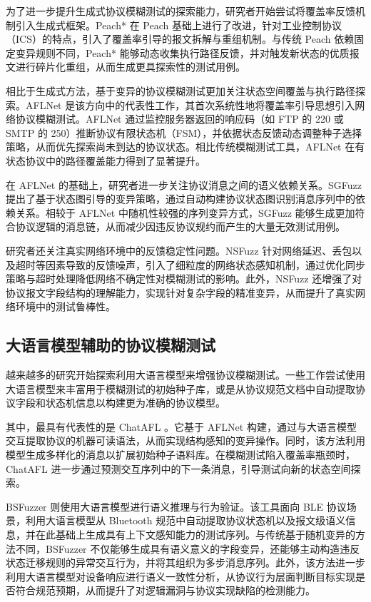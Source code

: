 为了进一步提升生成式协议模糊测试的探索能力，研究者开始尝试将覆盖率反馈机制引入生成式框架。Peach*\cite{Luoetal2020} 在 Peach 基础上进行了改进，针对工业控制协议（ICS）的特点，引入了覆盖率引导的报文拆解与重组机制。与传统 Peach 依赖固定变异规则不同，Peach* 能够动态收集执行路径反馈，并对触发新状态的优质报文进行碎片化重组，从而生成更具探索性的测试用例。

相比于生成式方法，基于变异的协议模糊测试更加关注状态空间覆盖与执行路径探索。AFLNet\cite{pham2020aflnet} 是该方向中的代表性工作，其首次系统性地将覆盖率引导思想引入网络协议模糊测试。AFLNet 通过监控服务器返回的响应码（如 FTP 的 220 或 SMTP 的 250）推断协议有限状态机（FSM），并依据状态反馈动态调整种子选择策略，从而优先探索尚未到达的协议状态。相比传统模糊测试工具，AFLNet 在有状态协议中的路径覆盖能力得到了显著提升。

在 AFLNet 的基础上，研究者进一步关注协议消息之间的语义依赖关系。SGFuzz\cite{ba2022sgfuzz} 提出了基于状态图引导的变异策略，通过自动构建协议状态图识别消息序列中的依赖关系。相较于 AFLNet 中随机性较强的序列变异方式，SGFuzz 能够生成更加符合协议逻辑的消息链，从而减少因违反协议规约而产生的大量无效测试用例。

研究者还关注真实网络环境中的反馈稳定性问题。NSFuzz\cite{qin2023nsfuzz} 针对网络延迟、丢包以及超时等因素导致的反馈噪声，引入了细粒度的网络状态感知机制，通过优化同步策略与超时处理降低网络不确定性对模糊测试的影响。此外，NSFuzz 还增强了对协议报文字段结构的理解能力，实现针对复杂字段的精准变异，从而提升了真实网络环境中的测试鲁棒性。

\subsection{大语言模型辅助的协议模糊测试}

越来越多的研究开始探索利用大语言模型来增强协议模糊测试。一些工作尝试使用大语言模型来丰富用于模糊测试的初始种子库，或是从协议规范文档中自动提取协议字段和状态机信息以构建更为准确的协议模型。

其中，最具有代表性的是 ChatAFL \cite{meng2024large}。它基于 AFLNet 构建，通过与大语言模型交互提取协议的机器可读语法，从而实现结构感知的变异操作。同时，该方法利用模型生成多样化的消息以扩展初始种子语料库。在模糊测试陷入覆盖率瓶颈时，ChatAFL 进一步通过预测交互序列中的下一条消息，引导测试向新的状态空间探索。

BSFuzzer\cite{yang2026bsfuzzer} 则使用大语言模型进行语义推理与行为验证。该工具面向 BLE 协议场景，利用大语言模型从 Bluetooth 规范中自动提取协议状态机以及报文级语义信息，并在此基础上生成具有上下文感知能力的测试序列。与传统基于随机变异的方法不同，BSFuzzer 不仅能够生成具有语义意义的字段变异，还能够主动构造违反状态迁移规则的异常交互行为，并将其组织为多步消息序列。此外，该方法进一步利用大语言模型对设备响应进行语义一致性分析，从协议行为层面判断目标实现是否符合规范预期，从而提升了对逻辑漏洞与协议实现缺陷的检测能力。

